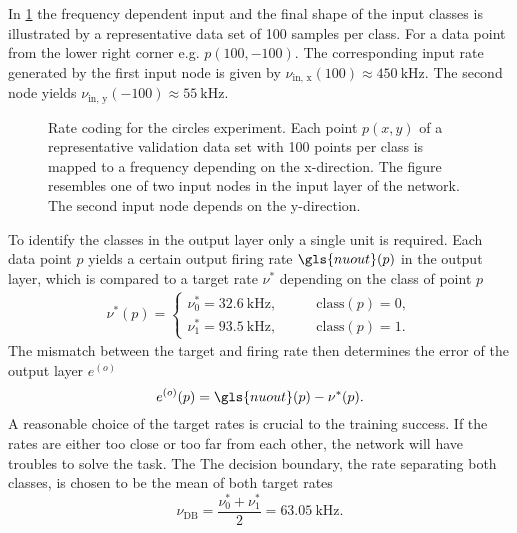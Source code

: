In \cref{circlesinputs} the frequency dependent input and the final shape of the input classes is illustrated by a representative data set of 100 samples per class. For a data point from the lower right corner e.g. $p(100,-100)$. The corresponding input rate generated by the first input node is given by $\nu_{\text{in, x}}(100) \approx \SI{450}{\kilo \Hz}$. The second node yields $\nu_{\text{in, y}}(-100) \approx \SI{55}{\kilo \Hz}$.
\begin{figure}[htb!]
	\begin{subfigure}[c]{0.5\textwidth}
		\centering
	\end{subfigure}
	\begin{subfigure}[c]{0.5\textwidth}
		\centering
	\end{subfigure}
	\caption[Rate coding for the circles experiment.]{Rate coding for the circles experiment. Each point $p(x,y)$ of a representative validation data set with 100 points per class is mapped to a frequency depending on the x-direction. The figure resembles one of two input nodes in the input layer of the network. The second input node depends on the y-direction.}
	\label{circlesinputs}
\end{figure}
To identify the classes in the output layer only a single unit is required. Each data point $p$ yields a certain output firing rate $\gls{nuout}(p)$ in the output layer, which is compared to a target rate $\nu^*$ depending on the class of point $p$
\begin{align}
\nu^*(p) =
\begin{cases}
\nu_0^* = \SI{32.6}{\kilo \Hz} ,&\quad \quad \text{class}(p) = 0,\\
\nu_1^* = \SI{93.5}{\kilo \Hz} ,&\quad \quad \text{class}(p) = 1.
\end{cases}
\label{circlestarget}
\end{align}
The mismatch between the target and firing rate then determines the error of the output layer $e^{(o)}$
\begin{equation*}
e^{(o)}(p) = \gls{nuout}(p) - \nu^*(p).
\label{circleserror}
\end{equation*}
A reasonable choice of the target rates is crucial to the training success. If the rates are either too close or too far from each other, the network will have troubles to solve the task. The The decision boundary, the rate separating both classes, is chosen to be the mean of both target rates
\begin{equation*}
\nu_\text{DB} = \frac{\nu_0^* + \nu_1^*}{2} = \SI{63.05}{\kilo \Hz}.
\label{circlesdb}
\end{equation*}



